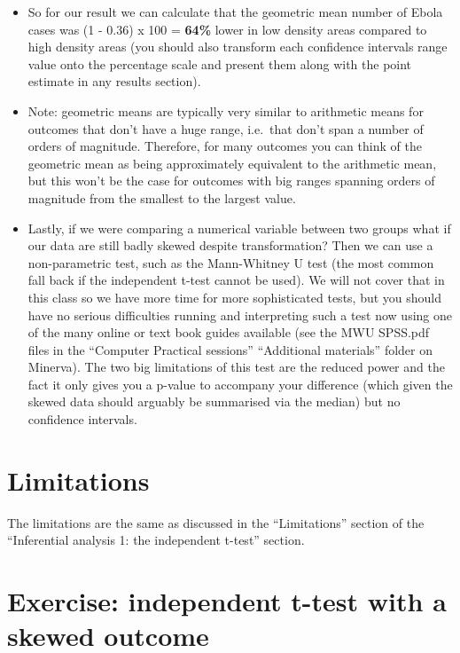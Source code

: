 \documentclass[
]{book}
\begin{document}
\begin{itemize}
\item
  So for our result we can calculate that the geometric mean number of Ebola cases was (1 - 0.36) x 100 = \textbf{64\%} lower in low density areas compared to high density areas (you should also transform each confidence intervals range value onto the percentage scale and present them along with the point estimate in any results section).
\item
  Note: geometric means are typically very similar to arithmetic means for outcomes that don't have a huge range, i.e.~that don't span a number of orders of magnitude. Therefore, for many outcomes you can think of the geometric mean as being approximately equivalent to the arithmetic mean, but this won't be the case for outcomes with big ranges spanning orders of magnitude from the smallest to the largest value.
\item
  Lastly, if we were comparing a numerical variable between two groups what if our data are still badly skewed despite transformation? Then we can use a non-parametric test, such as the Mann-Whitney U test (the most common fall back if the independent t-test cannot be used). We will not cover that in this class so we have more time for more sophisticated tests, but you should have no serious difficulties running and interpreting such a test now using one of the many online or text book guides available (see the MWU SPSS.pdf files in the ``Computer Practical sessions'' ``Additional materials'' folder on Minerva). The two big limitations of this test are the reduced power and the fact it only gives you a p-value to accompany your difference (which given the skewed data should arguably be summarised via the median) but no confidence intervals.
\end{itemize}

\hypertarget{limitations-1}{%
\section{Limitations}\label{limitations-1}}

The limitations are the same as discussed in the ``Limitations'' section of the ``Inferential analysis 1: the independent t-test'' section.

\hypertarget{exercise-independent-t-test-with-a-skewed-outcome}{%
\section{Exercise: independent t-test with a skewed outcome}\label{exercise-independent-t-test-with-a-skewed-outcome}}
\end{document}
